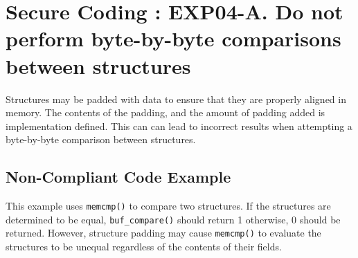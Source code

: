 
   \section{Secure Coding : EXP04-A. Do not perform byte-by-byte comparisons between structures}

   Structures may be padded with data to ensure that they are properly aligned in memory. The contents of the padding, and the amount of padding added is implementation defined. This can can lead to incorrect results when attempting a byte-by-byte comparison between structures.
   \subsection{Non-Compliant Code Example}

   This example uses {\tt memcmp()} to compare two structures. If the structures are determined to be equal, {\tt buf\_compare()} should return 1 otherwise, 0 should be returned. However, structure padding may cause {\tt memcmp()} to evaluate the structures to be unequal regardless of the contents of their fields.

